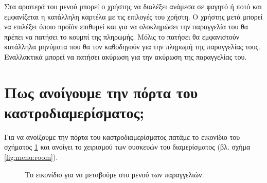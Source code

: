 \documentclass[a4paper,titlepage,twoside,12pt,leqno]{article}
\begin{document}
Στα αριστερά του μενού μπορεί ο χρήστης να διαλέξει ανάμεσα σε φαγητό ή ποτό και εμφανίζεται η κατάλληλη καρτέλα με τις επιλογές του χρήστη. Ο χρήστης μετά μπορεί να επιλέξει όποιο προϊόν επιθυμεί και για να ολοκληρώσει την παραγγελία του θα πρέπει να πατήσει το κουμπί της πληρωμής. Μόλις το πατήσει θα εμφανιστούν κατάλληλα μηνύματα που θα τον καθοδηγούν για την πληρωμή της παραγγελίας τους. Εναλλακτικά μπορεί να πατήσει ακύρωση για την ακύρωση της παραγγελίας του.


\newpage
\section{Πως ανοίγουμε την πόρτα του καστροδιαμερίσματος;}

Για να ανοίξουμε την πόρτα του καστροδιαμερίσματος πατάμε το εικονίδιο του σχήματος \ref{fig:icon:room} και ανοίγει το χειρισμού των συσκευών του διαμερίσματος (βλ. σχήμα \ref{fig:menu:room}).

\begin{figure}
\begin{center}
\caption{Το εικονίδιο για να μεταβούμε στο μενού των παραγγελιών.}
\label{fig:icon:room}
\end{center}
\end{figure}
\end{document}
